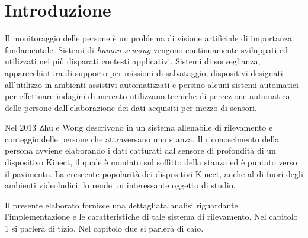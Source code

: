 
\chapter*{Introduzione}
\label{cap:Introduzione}
Il monitoraggio delle persone è un problema di visione artificiale di importanza fondamentale.
Sistemi di \emph{human sensing} vengono continuamente sviluppati ed utilizzati nei più disparati contesti applicativi. Sistemi di sorveglianza, apparecchiatura di supporto per missioni di salvataggio, dispositivi designati all'utilizzo in ambienti assistivi automatizzati e persino alcuni sistemi automatici per effettuare indagini di mercato utilizzano tecniche di percezione automatica delle persone dall'elaborazione dei dati acquisiti per mezzo di sensori.

Nel 2013 Zhu e Wong descrivono in \cite{Zhu13} un sistema allenabile di rilevamento e conteggio delle persone che attraversano una stanza.
Il riconoscimento della persona avviene elaborando i dati catturati dal sensore di profondità di un dispositivo Kinect, il quale è montato sul soffitto della stanza ed è puntato verso il pavimento. La crescente popolarità dei dispositivi Kinect, anche al di fuori degli ambienti videoludici, lo rende un interessante oggetto di studio.

Il presente elaborato fornisce una dettagliata analisi riguardante l'implementazione e le caratteristiche di tale sistema di rilevamento.
Nel capitolo 1 si parlerà di tizio, Nel capitolo due si parlerà di caio.

